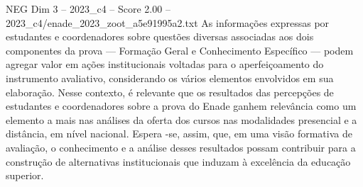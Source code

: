 \begin{textsample}{NEG Dim 3 – 2023\_c4 – Score 2.00 – 2023\_c4/enade\_2023\_zoot\_a5e91995a2.txt}
As informações expressas por estudantes e coordenadores sobre questões diversas associadas aos dois componentes da prova — Formação Geral e Conhecimento Específico — podem agregar valor em ações institucionais voltadas para o aperfeiçoamento do instrumento avaliativo, considerando os vários elementos envolvidos em sua elaboração.
Nesse contexto, é relevante que os resultados das percepções de estudantes e coordenadores sobre a prova do Enade ganhem relevância como um elemento a mais nas análises da oferta dos cursos nas modalidades presencial e a distância, em nível nacional.
Espera -se, assim, que, em uma visão formativa de avaliação, o conhecimento e a análise desses resultados possam contribuir para a construção de alternativas institucionais que induzam à excelência da educação superior.

\end{textsample}
